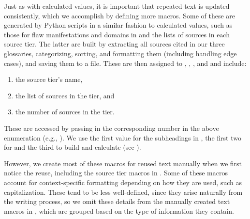 \label{text-macros}
Just as with calculated values, it is important that repeated text is updated
consistently, which we accomplish by defining more macros. Some of these are
generated by Python scripts in a similar fashion to calculated values, such as
those for flaw manifestations and domains in  and the
lists of sources in each source tier. The latter are built by extracting all
sources cited in our three glossaries, categorizing, sorting, and formatting
them (including handling edge cases), and saving them to a file. These are then
assigned to , , , and
 and include:
\begin{enumerate}
    \item the source tier's name,
    \item the list of sources in the tier, and
    \item the number of sources in the tier.
\end{enumerate}
These are accessed by passing in the corresponding number in the above
enumeration (e.g., ). We use the first value for the
subheadings in , the first two for  and the
third to build  and calculate 
(see ).

However, we create most of these macros for reused text manually when we first
notice the reuse, including the source tier macros in .
Some of these macros account for context-specific formatting depending on how
they are used, such as capitalization. These tend to be less well-defined,
since they arise naturally from the writing process, so we omit these details
from the manually created text macros in , which are
grouped based on the type of information they contain.

\begin{landscape}
    
\end{landscape}

